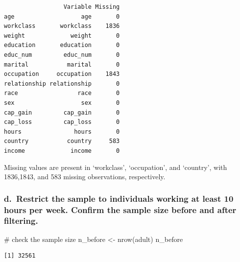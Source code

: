 \documentclass[
  letterpaper,
  DIV=11,
  numbers=noendperiod]{scrartcl}
\newenvironment{Shaded}{\begin{snugshade}}{\end{snugshade}}
\newcommand{\CommentTok}[1]{\textcolor[rgb]{0.37,0.37,0.37}{#1}}
\newcommand{\DecValTok}[1]{\textcolor[rgb]{0.68,0.00,0.00}{#1}}
\newcommand{\FunctionTok}[1]{\textcolor[rgb]{0.28,0.35,0.67}{#1}}
\newcommand{\NormalTok}[1]{\textcolor[rgb]{0.00,0.23,0.31}{#1}}
\newcommand{\OtherTok}[1]{\textcolor[rgb]{0.00,0.23,0.31}{#1}}
\newcommand{\SpecialCharTok}[1]{\textcolor[rgb]{0.37,0.37,0.37}{#1}}
\begin{document}
\begin{verbatim}
                 Variable Missing
age                   age       0
workclass       workclass    1836
weight             weight       0
education       education       0
educ_num         educ_num       0
marital           marital       0
occupation     occupation    1843
relationship relationship       0
race                 race       0
sex                   sex       0
cap_gain         cap_gain       0
cap_loss         cap_loss       0
hours               hours       0
country           country     583
income             income       0
\end{verbatim}

Missing values are present in `workclass', `occupation', and `country',
with 1836,1843, and 583 missing observations, respectively.

\subsubsection{d.~Restrict the sample to individuals working at least 10
hours per week. Confirm the sample size before and after
filtering.}\label{d.-restrict-the-sample-to-individuals-working-at-least-10-hours-per-week.-confirm-the-sample-size-before-and-after-filtering.}

\begin{Shaded}
\begin{Highlighting}[]
\CommentTok{\# check the sample size}
\NormalTok{n\_before }\OtherTok{\textless{}{-}} \FunctionTok{nrow}\NormalTok{(adult)}
\NormalTok{n\_before}
\end{Highlighting}
\end{Shaded}

\begin{verbatim}
[1] 32561
\end{verbatim}

\begin{Shaded}
\end{Shaded}
\end{document}

